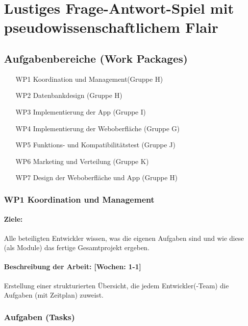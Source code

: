 \documentclass{report}
\begin{document}
\chapter{Lustiges Frage-Antwort-Spiel mit pseudowissenschaftlichem Flair}


\section*{Aufgabenbereiche (Work Packages)}

\begin{enumerate}
\item [WP1] Koordination und Management(Gruppe H)
\item [WP2] Datenbankdesign (Gruppe H)
\item [WP3] Implementierung der App (Gruppe I)
\item [WP4] Implementierung der Weboberfläche (Gruppe G)
\item [WP5] Funktions- und Kompatibilitätstest (Gruppe J)
\item [WP6] Marketing und Verteilung (Gruppe K)
\item [WP7] Design der Weboberfläche und App (Gruppe H)
\end{enumerate}


\subsection*{WP1 Koordination und Management}

\subsubsection{Ziele:} Alle beteiligten Entwickler wissen, was die eigenen Aufgaben sind und wie diese (als Module) das fertige Gesamtprojekt ergeben.
\subsubsection{Beschreibung der Arbeit: [Wochen: 1-1]} Erstellung einer strukturierten Übersicht, die jedem Entwickler(-Team) die Aufgaben (mit Zeitplan) zuweist.

\subsection*{Aufgaben (Tasks)}
\end{document}
